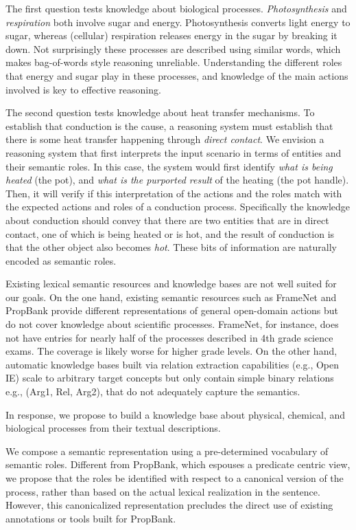 The first question tests knowledge about biological processes.
{\em Photosynthesis} and {\em respiration} both involve sugar and energy. 
Photosynthesis converts light energy to sugar, whereas (cellular) respiration releases energy in the sugar by breaking it down. 
Not surprisingly these processes are described using similar words, which makes bag-of-words style reasoning unreliable. 
Understanding the different roles that energy and sugar play in these processes, and knowledge of the main actions involved is key to effective reasoning.

The second question tests knowledge about heat transfer mechanisms.
To establish that conduction is the cause, a reasoning system must establish that there is some heat transfer happening through {\em direct contact}. 
We envision a reasoning system that first interprets the input scenario in terms of entities and their semantic roles. 
In this case, the system would first identify {\em what is being heated} (the pot), and {\em what is the purported result} of the heating (the pot handle). 
Then, it will verify if this interpretation of the actions and the roles match with the expected actions and roles of a conduction process. 
Specifically the knowledge about conduction should convey that there are two entities that are in direct contact, one of which is being heated or is hot, 
and the result of conduction is that the other object also becomes {\em hot}. 
These bits of information are naturally encoded as semantic roles.

Existing lexical semantic resources and knowledge bases are not well suited for our goals.
On the one hand, existing semantic resources such as FrameNet and PropBank provide different representations of 
general open-domain actions but do not cover knowledge about scientific processes. 
FrameNet, for instance, does not have entries for nearly half of the processes described in 4th grade science exams. 
The coverage is likely worse for higher grade levels. On the other hand, automatic knowledge bases built via relation extraction
capabilities (e.g., Open IE) scale to arbitrary target concepts but only contain simple binary relations e.g., (Arg1, Rel, Arg2), that do not adequately capture the semantics.

In response, we propose to build a knowledge base about physical, chemical, and biological processes from their textual descriptions. 

We compose a semantic representation using a pre-determined vocabulary of semantic roles. 
Different from PropBank, which espouses a predicate centric view, we propose that the roles be identified with respect to a canonical version of the process, rather than based on the actual lexical realization in the sentence.
However, this canonicalized representation precludes the direct use of existing annotations or tools built for PropBank.


